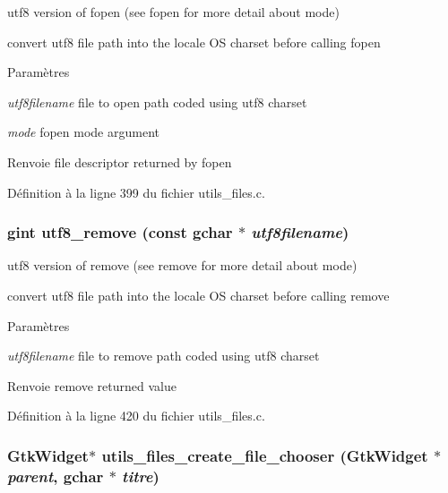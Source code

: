 utf8 version of fopen (see fopen for more detail about mode) 

convert utf8 file path into the locale OS charset before calling fopen


\begin{DoxyParams}{Paramètres}
\item[{\em utf8filename}]file to open path coded using utf8 charset \item[{\em mode}]fopen mode argument\end{DoxyParams}
\begin{DoxyReturn}{Renvoie}
file descriptor returned by fopen 
\end{DoxyReturn}


Définition à la ligne 399 du fichier utils\_\-files.c.

\subsubsection[{utf8\_\-remove}]{\setlength{\rightskip}{0pt plus 5cm}gint utf8\_\-remove (const gchar $\ast$ {\em utf8filename})}\label{utils__files_8c_a79409776739f0f2778cd6d4f477b6dd2}


utf8 version of remove (see remove for more detail about mode) 

convert utf8 file path into the locale OS charset before calling remove


\begin{DoxyParams}{Paramètres}
\item[{\em utf8filename}]file to remove path coded using utf8 charset\end{DoxyParams}
\begin{DoxyReturn}{Renvoie}
remove returned value 
\end{DoxyReturn}


Définition à la ligne 420 du fichier utils\_\-files.c.

\subsubsection[{utils\_\-files\_\-create\_\-file\_\-chooser}]{\setlength{\rightskip}{0pt plus 5cm}GtkWidget$\ast$ utils\_\-files\_\-create\_\-file\_\-chooser (GtkWidget $\ast$ {\em parent}, \/  gchar $\ast$ {\em titre})}\label{utils__files_8c_ad52941b893b0fcc21576cebdaa93fe96}


